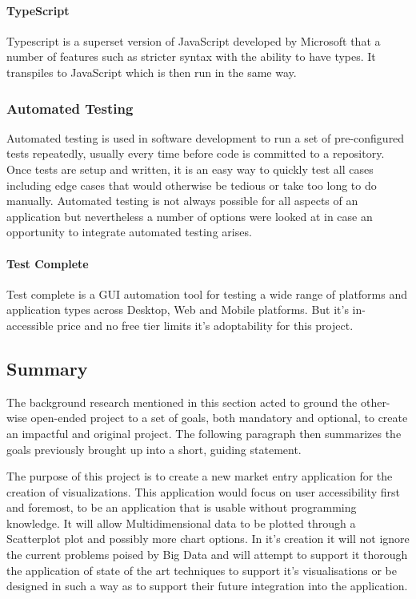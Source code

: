\paragraph{TypeScript}
Typescript is a superset version of JavaScript developed by Microsoft that a number of features such as stricter syntax with the ability to have types. It transpiles to JavaScript which is then run in the same way. \cite[]{microsoft_typescript}

\subsubsection{Automated Testing}
Automated testing is used in software development to run a set of pre-configured tests repeatedly, usually every time before code is committed to a repository. Once tests are setup and written, it is an easy way to quickly test all cases including edge cases that would otherwise be tedious or take too long to do manually. Automated testing is not always possible for all aspects of an application but nevertheless a number of options were looked at in case an opportunity to integrate automated testing arises.

\paragraph{Test Complete}
Test complete is a GUI automation tool for testing a wide range of platforms and application types across Desktop, Web and Mobile platforms. \cite[]{smartbear_testcomplete}
But it's in-accessible price and no free tier limits it's adoptability for this project.



\subsection{Summary} \label{ressummary}

The background research mentioned in this section acted to ground the other-wise open-ended project to a set of goals, both mandatory and optional, to create an impactful and original project. The following paragraph then summarizes the goals previously brought up into a short, guiding statement.

\begin{displayquote}
    The purpose of this project is to create a new market entry application for the creation of visualizations. This application would focus on user accessibility first and foremost, to be an application that is usable without programming knowledge. It will allow Multidimensional data to be plotted through a Scatterplot plot and possibly more chart options. In it's creation it will not ignore the current problems poised by Big Data and will attempt to support it thorough the application of state of the art techniques to support it's visualisations or be designed in such a way as to support their future integration into the application.
\end{displayquote}


